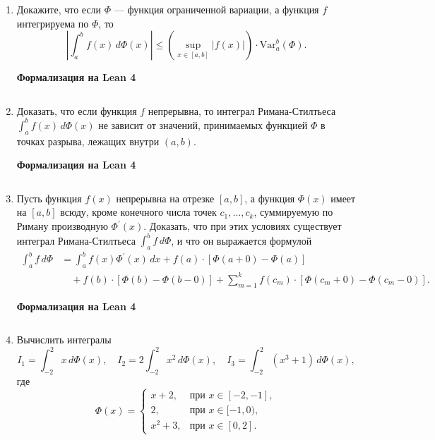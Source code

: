 \documentclass[12pt,a4paper]{article}
\begin{document}
\begin{enumerate}
\newpage
\item Докажите, что если $\Phi$ — функция ограниченной вариации, а функция $f$ интегрируема по $\Phi$, то
$$\left| \int_{a}^{b} f(x) \, d\Phi(x) \right| \le \left(\sup_{x\in[a, b]} |f(x)|\right) \cdot \text{Var}_{a}^{b}(\Phi).$$


\begin{center}\small\textbf{Формализация на Lean 4}\end{center}
\inputminted{lean}{FunAn/Section05_BVandRS/Task09.lean}

\newpage
\item Доказать, что если функция $f$ непрерывна, то интеграл Римана-Стилтьеса $\int_{a}^{b} f(x) \, d\Phi(x)$ не зависит от значений, принимаемых функцией $\Phi$ в точках разрыва, лежащих внутри $(a, b)$.


\begin{center}\small\textbf{Формализация на Lean 4}\end{center}
\inputminted{lean}{FunAn/Section05_BVandRS/Task10.lean}

\newpage
\item Пусть функция $f(x)$ непрерывна на отрезке $[a, b]$, а функция $\Phi(x)$ имеет на $[a, b]$ всюду, кроме конечного числа точек $c_{1}, \dots, c_{k}$, суммируемую по Риману производную $\Phi^{\prime}(x)$. Доказать, что при этих условиях существует интеграл Римана-Стилтьеса $\int_{a}^{b} f \, d\Phi$, и что он выражается формулой
\begin{align*}
\int_{a}^{b} f \, d\Phi &= \int_{a}^{b} f(x)\Phi^{\prime}(x) \, dx + f(a) \cdot [\Phi(a+0) - \Phi(a)] \\
&\quad + f(b) \cdot [\Phi(b) - \Phi(b-0)] + \sum_{m=1}^{k} f(c_{m}) \cdot [\Phi(c_{m}+0) - \Phi(c_{m}-0)].
\end{align*}


\begin{center}\small\textbf{Формализация на Lean 4}\end{center}
\inputminted{lean}{FunAn/Section05_BVandRS/Task11.lean}

\newpage

\item Вычислить интегралы
$$I_{1} = \int_{-2}^{2} x \, d\Phi(x), \quad I_{2} = 2\int_{-2}^{2} x^{2} \, d\Phi(x), \quad I_{3} = \int_{-2}^{2} (x^{3}+1) \, d\Phi(x),$$
где
$$\Phi(x) =
\begin{cases} x+2, & \text{при } x\in[-2, -1], \\ 2, & \text{при } x\in[-1, 0), \\ x^{2}+3, & \text{при } x\in[0, 2].
\end{cases}$$
\end{enumerate}
\end{document}
